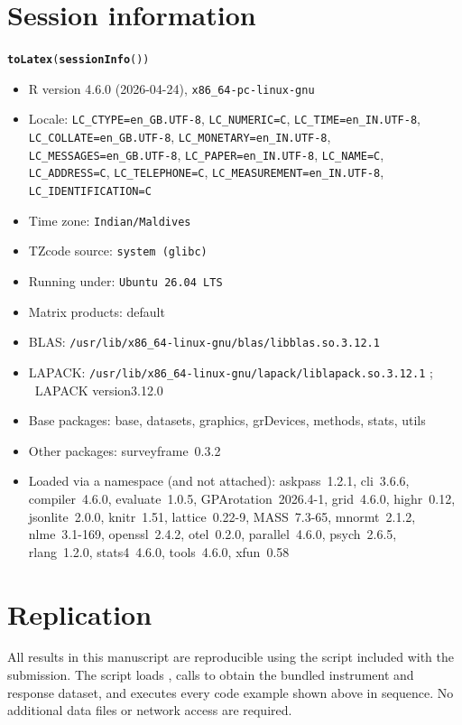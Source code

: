 \documentclass[article]{jss}\usepackage[]{graphicx}\usepackage[]{xcolor}
\makeatletter
\newcommand{\hldef}[1]{\textcolor[rgb]{0.345,0.345,0.345}{#1}}%
\newcommand{\hlkwd}[1]{\textcolor[rgb]{0.737,0.353,0.396}{\textbf{#1}}}%
\newenvironment{kframe}{%
 \def\at@end@of@kframe{}%
 \ifinner\ifhmode%
  \def\at@end@of@kframe{\end{minipage}}%
  \begin{minipage}{\columnwidth}%
 \fi\fi%
 \def\FrameCommand##1{\hskip\@totalleftmargin \hskip-\fboxsep
 \colorbox{shadecolor}{##1}\hskip-\fboxsep
     \hskip-\linewidth \hskip-\@totalleftmargin \hskip\columnwidth}%
 \MakeFramed {\advance\hsize-\width
   \@totalleftmargin\z@ \linewidth\hsize
   \@setminipage}}%
 {\par\unskip\endMakeFramed%
 \at@end@of@kframe}
\makeatother
\begin{document}
\begin{appendix}

\section{Session information}
\label{app:session}

\begin{kframe}
\begin{alltt}
\hlkwd{toLatex}\hldef{(}\hlkwd{sessionInfo}\hldef{())}
\end{alltt}
\end{kframe}\begin{itemize}\raggedright
  \item R version 4.6.0 (2026-04-24), \verb|x86_64-pc-linux-gnu|
  \item Locale: \verb|LC_CTYPE=en_GB.UTF-8|, \verb|LC_NUMERIC=C|, \verb|LC_TIME=en_IN.UTF-8|, \verb|LC_COLLATE=en_GB.UTF-8|, \verb|LC_MONETARY=en_IN.UTF-8|, \verb|LC_MESSAGES=en_GB.UTF-8|, \verb|LC_PAPER=en_IN.UTF-8|, \verb|LC_NAME=C|, \verb|LC_ADDRESS=C|, \verb|LC_TELEPHONE=C|, \verb|LC_MEASUREMENT=en_IN.UTF-8|, \verb|LC_IDENTIFICATION=C|
  \item Time zone: \verb|Indian/Maldives|
  \item TZcode source: \verb|system (glibc)|
  \item Running under: \verb|Ubuntu 26.04 LTS|
  \item Matrix products: default
  \item BLAS:   \verb|/usr/lib/x86_64-linux-gnu/blas/libblas.so.3.12.1|
  \item LAPACK: \verb|/usr/lib/x86_64-linux-gnu/lapack/liblapack.so.3.12.1|
; \quad\ LAPACK version3.12.0
  \item Base packages: base, datasets, graphics,
    grDevices, methods, stats, utils
  \item Other packages: surveyframe~0.3.2
  \item Loaded via a namespace (and not attached):
    askpass~1.2.1, cli~3.6.6, compiler~4.6.0,
    evaluate~1.0.5, GPArotation~2026.4-1, grid~4.6.0,
    highr~0.12, jsonlite~2.0.0, knitr~1.51,
    lattice~0.22-9, MASS~7.3-65, mnormt~2.1.2,
    nlme~3.1-169, openssl~2.4.2, otel~0.2.0,
    parallel~4.6.0, psych~2.6.5, rlang~1.2.0,
    stats4~4.6.0, tools~4.6.0, xfun~0.58
\end{itemize}


\section{Replication}

All results in this manuscript are reproducible using the
 script included with the submission. The script
loads , calls  to obtain
the bundled instrument and response dataset, and executes every code
example shown above in sequence. No additional data files or network
access are required.

\end{appendix}
\end{document}
